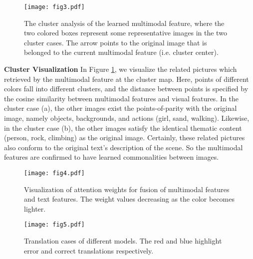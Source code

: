 \documentclass[11pt]{article}
\begin{document}
\begin{figure}[!t]
\centering
\setlength{\abovecaptionskip}{-3pt}
\setlength{\belowcaptionskip}{-10pt}
{\texttt{[image: fig3.pdf]} \label{fig3}}
\centering
\caption{The cluster analysis of the learned multimodal feature, where the two colored boxes represent some representative images in the two cluster cases. The arrow points to the original image that is belonged to the current multimodal feature (i.e. cluster center).}
\label{fig:Fig3}
\end{figure}

\textbf{Cluster Visualization}
In Figure \ref{fig:Fig3}, we visualize the related pictures which retrieved by the multimodal feature at the cluster map.
Here, points of different colors fall into different clusters, and the distance between points is specified by the cosine similarity between multimodal features and visual features.
In the cluster case (a), the other images exist the points-of-parity with the original image, namely objects, backgrounds, and actions (girl, sand, walking). Likewise, in the cluster case (b), the other images satisfy the identical thematic content (person, rock, climbing) as the original image.
Certainly, these related pictures also conform to the original text's description of the scene.
So the multimodal features are confirmed to have learned commonalities between images.

\begin{figure}[!t]
\centering
\setlength{\abovecaptionskip}{-1pt}
{\texttt{[image: fig4.pdf]} \label{fig4}}
\centering
\caption{Visualization of attention weights for fusion of multimodal features and text features. The weight values decreasing as the color becomes lighter.}
\label{fig:Fig4}
\end{figure}

\begin{figure*}[!t]
\centering
\setlength{\abovecaptionskip}{-0.5pt}
{\texttt{[image: fig5.pdf]} \label{fig5}}
\centering
\caption{Translation cases of different models. The red and blue highlight error and correct translations respectively.}
\label{fig:Fig5}
\end{figure*}
\end{document}
